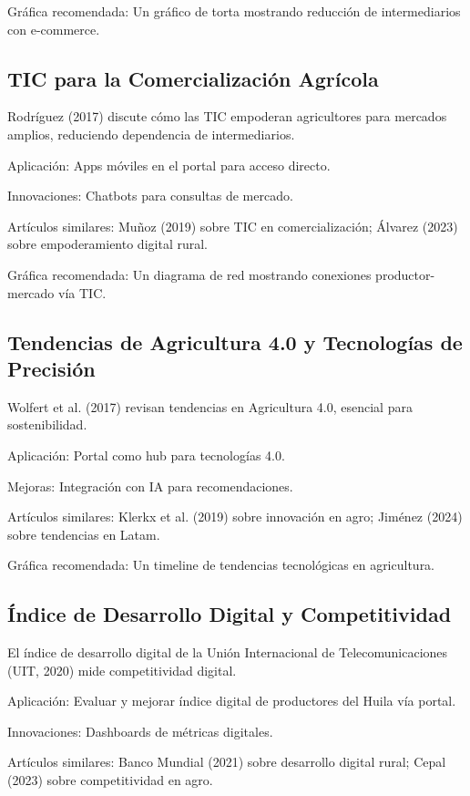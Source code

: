 Gráfica recomendada: Un gráfico de torta mostrando reducción de intermediarios con e-commerce.

\subsection{TIC para la Comercialización Agrícola}

Rodríguez (2017) discute cómo las TIC empoderan agricultores para mercados amplios, reduciendo dependencia de intermediarios.

Aplicación: Apps móviles en el portal para acceso directo.

Innovaciones: Chatbots para consultas de mercado.

Artículos similares: Muñoz (2019) sobre TIC en comercialización; Álvarez (2023) sobre empoderamiento digital rural.

Gráfica recomendada: Un diagrama de red mostrando conexiones productor-mercado vía TIC.

\subsection{Tendencias de Agricultura 4.0 y Tecnologías de Precisión}

Wolfert et al. (2017) revisan tendencias en Agricultura 4.0, esencial para sostenibilidad.

Aplicación: Portal como hub para tecnologías 4.0.

Mejoras: Integración con IA para recomendaciones.

Artículos similares: Klerkx et al. (2019) sobre innovación en agro; Jiménez (2024) sobre tendencias en Latam.

Gráfica recomendada: Un timeline de tendencias tecnológicas en agricultura.

\subsection{Índice de Desarrollo Digital y Competitividad}

El índice de desarrollo digital de la Unión Internacional de Telecomunicaciones (UIT, 2020) mide competitividad digital.

Aplicación: Evaluar y mejorar índice digital de productores del Huila vía portal.

Innovaciones: Dashboards de métricas digitales.

Artículos similares: Banco Mundial (2021) sobre desarrollo digital rural; Cepal (2023) sobre competitividad en agro.

